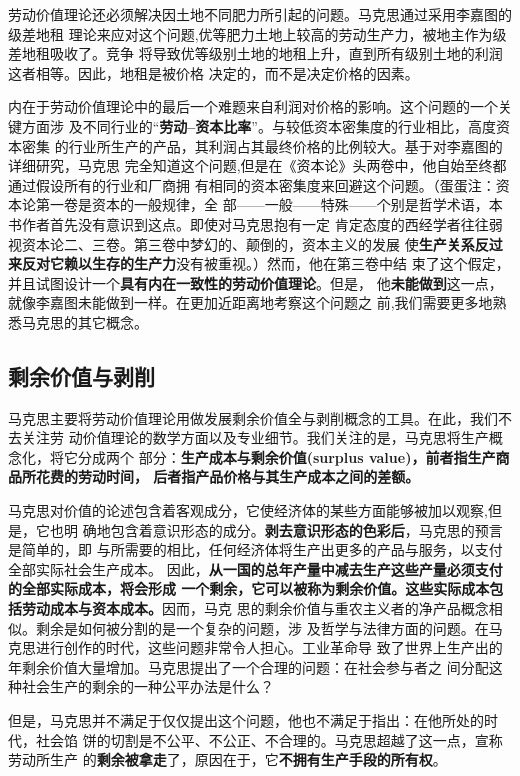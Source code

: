 劳动价值理论还必须解决因土地不同肥力所引起的问题。马克思通过采用李嘉图的级差地租
理论来应对这个问题,优等肥力土地上较高的劳动生产力，被地主作为级差地租吸收了。竞争
将导致优等级别土地的地租上升，直到所有级别土地的利润这者相等。因此，地租是被价格
决定的，而不是决定价格的因素。

内在于劳动价值理论中的最后一个难题来自利润对价格的影响。这个问题的一个关键方面涉
及不同行业的“\textbf{劳动--资本比率}”。与较低资本密集度的行业相比，高度资本密集
的行业所生产的产品，其利润占其最终价格的比例较大。基于对李嘉图的详细研究，马克思
完全知道这个问题,但是在《资本论》头两卷中，他自始至终都通过假设所有的行业和厂商拥
有相同的资本密集度来回避这个问题。（蛋蛋注：资本论第一卷是资本的一般规律，全
部——一般——特殊——个别是哲学术语，本书作者首先没有意识到这点。即使对马克思抱有一定
肯定态度的西经学者往往弱视资本论二、三卷。第三卷中梦幻的、颠倒的，资本主义的发展
使\textbf{生产关系反过来反对它赖以生存的生产力}没有被重视。）然而，他在第三卷中结
束了这个假定，并且试图设计一个\textbf{具有内在一致性的劳动价值理论}。但是，
他\textbf{未能做到}这一点，就像李嘉图未能做到一样。在更加近距离地考察这个问题之
前,我们需要更多地熟悉马克思的其它概念。
\clearpage
\subsection{剩余价值与剥削}

马克思主要将劳动价值理论用做发展剩余价值全与剥削概念的工具。在此，我们不去关注劳
动价值理论的数学方面以及专业细节。我们关注的是，马克思将生产概念化，将它分成两个
部分：\textbf{生产成本与剩余价值(surplus value)，前者指生产商品所花费的劳动时间，
  后者指产品价格与其生产成本之间的差额。}

马克思对价值的论述包含着客观成分，它使经济体的某些方面能够被加以观察,但是，它也明
确地包含着意识形态的成分。\textbf{剥去意识形态的色彩后}，马克思的预言是简单的，即
与所需要的相比，任何经济体将生产出更多的产品与服务，以支付全部实际社会生产成本。
因此，\textbf{从一国的总年产量中减去生产这些产量必须支付的全部实际成本，将会形成
  一个剩余，它可以被称为剩余价值。这些实际成本包括劳动成本与资本成本。}因而，马克
思的剩余价值与重农主义者的净产品概念相似。剩余是如何被分割的是一个复杂的问题，涉
及哲学与法律方面的问题。在马克思进行创作的时代，这些问题非常令人担心。工业革命导
致了世界上生产出的年剩余价值大量增加。马克思提出了一个合理的问题：在社会参与者之
间分配这种社会生产的剩余的一种公平办法是什么？

但是，马克思并不满足于仅仅提出这个问题，他也不满足于指出：在他所处的时代，社会馅
饼的切割是不公平、不公正、不合理的。马克思超越了这一点，宣称劳动所生产
的\textbf{剩余被拿走}了，原因在于，它\textbf{不拥有生产手段的所有权}。

